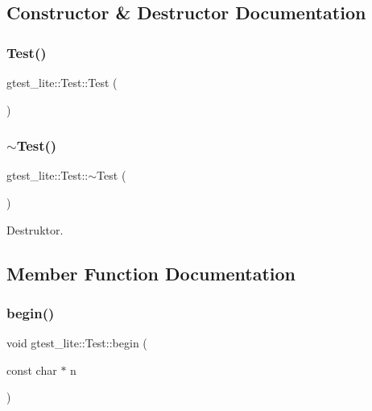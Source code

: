 \subsection{Constructor \& Destructor Documentation}
\mbox{\label{structgtest__lite_1_1_test_a99fb3f2338e4e0512beb6e19c5409078}} 
\subsubsection{Test()}
{\footnotesize\ttfamily gtest\+\_\+lite\+::\+Test\+::\+Test (\begin{DoxyParamCaption}{ }\end{DoxyParamCaption})\hspace{0.3cm}{\ttfamily [inline]}}

\mbox{\label{structgtest__lite_1_1_test_a5a879233c2aa110626668c06140f6e71}} 
\subsubsection{$\sim$\+Test()}
{\footnotesize\ttfamily gtest\+\_\+lite\+::\+Test\+::$\sim$\+Test (\begin{DoxyParamCaption}{ }\end{DoxyParamCaption})\hspace{0.3cm}{\ttfamily [inline]}}



Destruktor. 



\subsection{Member Function Documentation}
\mbox{\label{structgtest__lite_1_1_test_a2227b70fcc5dfb3c326bf117dd8f7e79}} 
\subsubsection{begin()}
{\footnotesize\ttfamily void gtest\+\_\+lite\+::\+Test\+::begin (\begin{DoxyParamCaption}\item[{const char $\ast$}]{n }\end{DoxyParamCaption})\hspace{0.3cm}{\ttfamily [inline]}}




